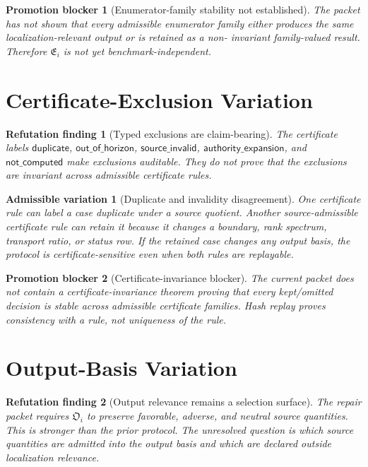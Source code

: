 \documentclass[11pt]{article}
\newcommand{\EnumFam}{\mathfrak{E}}
\newcommand{\OutFam}{\mathfrak{O}}
\newtheorem{finding}{Refutation finding}
\newtheorem{variation}{Admissible variation}
\newtheorem{blocker}{Promotion blocker}
\begin{document}
\begin{blocker}[Enumerator-family stability not established]
The packet has not shown that every admissible enumerator family either
produces the same localization-relevant output or is retained as a non-
invariant family-valued result. Therefore \(\EnumFam_i\) is not yet
benchmark-independent.
\end{blocker}

\section{Certificate-Exclusion Variation}

\begin{finding}[Typed exclusions are claim-bearing]
The certificate labels
\(\mathsf{duplicate}\), \(\mathsf{out\_of\_horizon}\),
\(\mathsf{source\_invalid}\), \(\mathsf{authority\_expansion}\), and
\(\mathsf{not\_computed}\) make exclusions auditable. They do not prove that
the exclusions are invariant across admissible certificate rules.
\end{finding}

\begin{variation}[Duplicate and invalidity disagreement]
One certificate rule can label a case duplicate under a source quotient.
Another source-admissible certificate rule can retain it because it changes
a boundary, rank spectrum, transport ratio, or status row. If the retained
case changes any output basis, the protocol is certificate-sensitive even
when both rules are replayable.
\end{variation}

\begin{blocker}[Certificate-invariance blocker]
The current packet does not contain a certificate-invariance theorem proving
that every kept/omitted decision is stable across admissible certificate
families. Hash replay proves consistency with a rule, not uniqueness of the
rule.
\end{blocker}

\section{Output-Basis Variation}

\begin{finding}[Output relevance remains a selection surface]
The repair packet requires \(\OutFam_i\) to preserve favorable, adverse, and
neutral source quantities. This is stronger than the prior protocol. The
unresolved question is which source quantities are admitted into the output
basis and which are declared outside localization relevance.
\end{finding}
\end{document}
